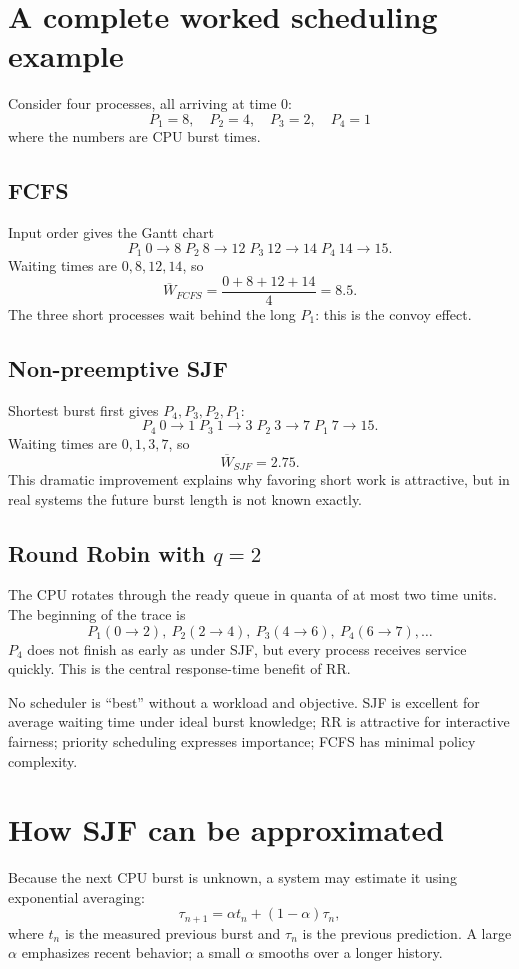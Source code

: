 \section{A complete worked scheduling example}
Consider four processes, all arriving at time 0:
\[
P_1=8,\quad P_2=4,\quad P_3=2,\quad P_4=1
\]
where the numbers are CPU burst times.

\subsection{FCFS}
Input order gives the Gantt chart
\[
\boxed{P_1\ 0\!\to\!8}\;\boxed{P_2\ 8\!\to\!12}\;\boxed{P_3\ 12\!\to\!14}\;\boxed{P_4\ 14\!\to\!15}.
\]
Waiting times are $0,8,12,14$, so
\[
\overline W_{FCFS}=\frac{0+8+12+14}{4}=8.5.
\]
The three short processes wait behind the long $P_1$: this is the convoy effect.

\subsection{Non-preemptive SJF}
Shortest burst first gives $P_4,P_3,P_2,P_1$:
\[
\boxed{P_4\ 0\!\to\!1}\;\boxed{P_3\ 1\!\to\!3}\;\boxed{P_2\ 3\!\to\!7}\;\boxed{P_1\ 7\!\to\!15}.
\]
Waiting times are $0,1,3,7$, so
\[
\overline W_{SJF}=2.75.
\]
This dramatic improvement explains why favoring short work is attractive, but in real systems the future burst length is not known exactly.

\subsection{Round Robin with $q=2$}
The CPU rotates through the ready queue in quanta of at most two time units. The beginning of the trace is
\[
P_1(0\!\to\!2),\ P_2(2\!\to\!4),\ P_3(4\!\to\!6),\ P_4(6\!\to\!7),\ldots
\]
$P_4$ does not finish as early as under SJF, but every process receives service quickly. This is the central response-time benefit of RR.

\begin{keyidea}
No scheduler is ``best'' without a workload and objective. SJF is excellent for average waiting time under ideal burst knowledge; RR is attractive for interactive fairness; priority scheduling expresses importance; FCFS has minimal policy complexity.
\end{keyidea}

\section{How SJF can be approximated}
Because the next CPU burst is unknown, a system may estimate it using exponential averaging:
\[
\tau_{n+1}=\alpha t_n+(1-\alpha)\tau_n,
\]
where $t_n$ is the measured previous burst and $\tau_n$ is the previous prediction. A large $\alpha$ emphasizes recent behavior; a small $\alpha$ smooths over a longer history.


